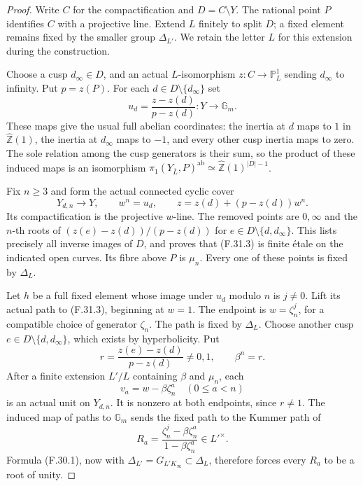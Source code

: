 \begin{proof}
Write $C$ for the compactification and $D=C\setminus Y$.
The rational point $P$ identifies $C$ with a projective
line.  Extend $L$ finitely to split $D$; a fixed element
remains fixed by the smaller group $\Delta_{L'}$.
We retain the letter $L$ for this extension during the
construction.

Choose a cusp $d_\infty\in D$, and an actual
$L$-isomorphism
$z:C\longrightarrow\mathbb P^1_L$
sending $d_\infty$ to infinity.
Put $p=z(P)$.
For each $d\in D\setminus\{d_\infty\}$ set
\[
       u_d=\frac{z-z(d)}{p-z(d)}:Y\longrightarrow\mathbb G_m.
                                                        \tag{F.31.2}
\]
These maps give the usual full abelian coordinates:
the inertia at $d$ maps to $1$ in
$\widehat{\mathbb Z}(1)$, the inertia at
$d_\infty$ maps to $-1$, and every other cusp inertia
maps to zero.  The sole relation among the cusp
generators is their sum, so the product of these
induced maps is an isomorphism
$\pi_1(Y_{\overline L},P)^{\mathrm{ab}}
 \simeq\widehat{\mathbb Z}(1)^{|D|-1}$.

Fix $n\geq3$ and form the actual connected cyclic cover
\[
  Y_{d,n}\longrightarrow Y,\qquad
              w^n=u_d,\qquad
              z=z(d)+(p-z(d))w^n.                        \tag{F.31.3}
\]
Its compactification is the projective $w$-line.
The removed points are $0,\infty$ and the $n$-th
roots of
$(z(e)-z(d))/(p-z(d))$ for
$e\in D\setminus\{d,d_\infty\}$.
This lists precisely all inverse images of $D$,
and proves that (F.31.3) is finite \'etale on
the indicated open curves.
Its fibre above $P$ is $\mu_n$.
Every one of these points is fixed by $\Delta_L$.

Let $h$ be a full fixed element whose image under
$u_d$ modulo $n$ is $j\ne0$.
Lift its actual path to (F.31.3), beginning at $w=1$.
The endpoint is $w=\zeta_n^j$, for a compatible
choice of generator $\zeta_n$.
The path is fixed by $\Delta_L$.
Choose another cusp
$e\in D\setminus\{d,d_\infty\}$, which exists by
hyperbolicity.  Put
\[
       r=\frac{z(e)-z(d)}{p-z(d)}\ne0,1,\qquad \beta^n=r.
\]
After a finite extension $L'/L$ containing $\beta$
and $\mu_n$, each
\[
                 v_a=w-\beta\zeta_n^a
                       \quad(0\leq a<n)                 \tag{F.31.4}
\]
is an actual unit on $Y_{d,n}$.
It is nonzero at both endpoints, since $r\ne1$.
The induced map of paths to $\mathbb G_m$ sends the
fixed path to the Kummer path of
\[
             R_a=
       \frac{\zeta_n^j-\beta\zeta_n^a}
            {1-\beta\zeta_n^a}\in L'^\times.             \tag{F.31.5}
\]
Formula (F.30.1), now with
$\Delta_{L'}=G_{L'K_\infty}\subset\Delta_L$,
therefore forces every $R_a$ to be a root of unity.


\end{proof}

